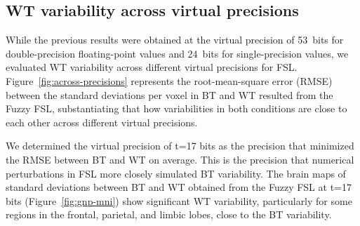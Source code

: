 \documentclass[conference]{IEEEtran}
\begin{document}
\begin{figure}[ht]
\end{figure}

\subsection{WT variability across virtual precisions}

While the previous results were obtained at the virtual precision of 53~bits for double-precision floating-point values
and 24~bits for single-precision values, we evaluated WT variability across different virtual precisions for FSL.
Figure~\ref{fig:across-precisions} represents the root-mean-square error (RMSE) between the standard deviations per voxel
in BT and WT resulted from the Fuzzy FSL,
substantiating that how variabilities in both conditions are close to each other across different virtual precisions.

We determined the virtual precision of t=17 bits as the precision that minimized the RMSE between BT and WT on average.
This is the precision that numerical perturbations in FSL more closely simulated BT variability.
The brain maps of standard deviations between BT and WT obtained from the Fuzzy FSL at t=17 bits (Figure~\ref{fig:gnp-mni})
show significant WT variability, particularly for some regions in the frontal, parietal, and limbic lobes, close to the BT variability.
\end{document}
